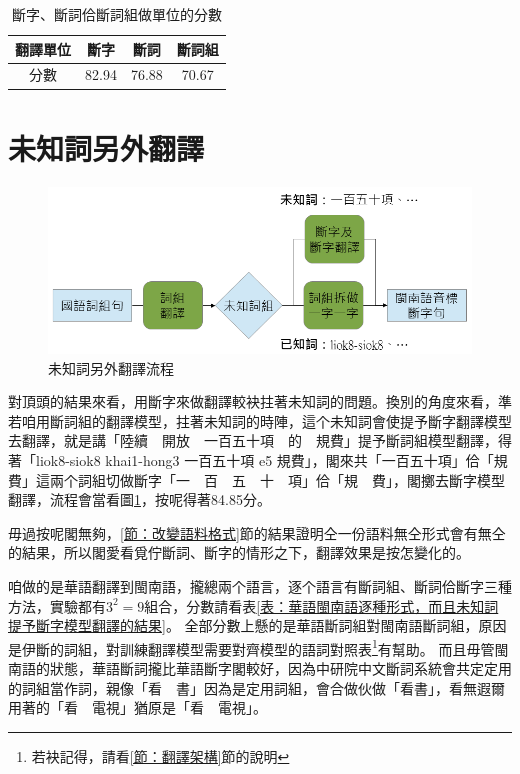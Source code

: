 \documentclass[final,oneside,onecolumn,12pt,a4paper]{book}%
\begin{document}
\begin{table}
\caption{斷字、斷詞佮斷詞組做單位的分數}%
\label{表：斷詞組、斷詞、斷字做單位的翻譯分數}
\centering
\begin{tabular}{c|ccc}
翻譯單位 & 斷字 & 斷詞 & 斷詞組\\
\hline
分數　& 82.94 & 76.88 & 70.67\\
\end{tabular}
\end{table}

\section{未知詞另外翻譯}
\label{節：未知詞另外翻譯}

\begin{figure}
\centerline{\includegraphics[keepaspectratio,width=40em]{圖/未知詞另外翻譯}}
\caption{未知詞另外翻譯流程}
\label{未知詞另外翻譯}
\end{figure}

對頂頭的結果來看，用斷字來做翻譯較袂拄著未知詞的問題。換別的角度來看，準若咱用斷詞組的翻譯模型，拄著未知詞的時陣，這个未知詞會使提予斷字翻譯模型去翻譯，就是講「陸續　開放　一百五十項　的　規費」提予斷詞組模型翻譯，得著「liok8-siok8 khai1-hong3 一百五十項 e5 規費」，閣來共「一百五十項」佮「規費」這兩个詞組切做斷字「一　百　五　十　項」佮「規　費」，閣擲去斷字模型翻譯，流程會當看圖\ref{未知詞另外翻譯}，按呢得著84.85分。

毋過按呢閣無夠，\ref{節：改變語料格式}節的結果證明仝一份語料無仝形式會有無仝的結果，所以閣愛看覓佇斷詞、斷字的情形之下，翻譯效果是按怎變化的。

咱做的是華語翻譯到閩南語，攏總兩个語言，逐个語言有斷詞組、斷詞佮斷字三種方法，實驗都有$3^{2}=9$組合，分數請看表\ref{表：華語閩南語逐種形式，而且未知詞提予斷字模型翻譯的結果}。
全部分數上懸的是華語斷詞組對閩南語斷詞組，原因是伊斷的詞組，對訓練翻譯模型需要對齊模型的語詞對照表\footnote{若袂記得，請看\ref{節：翻譯架構}節的說明}有幫助。
而且毋管閩南語的狀態，華語斷詞攏比華語斷字閣較好，因為中研院中文斷詞系統會共定定用的詞組當作詞，親像「看　書」因為是定用詞組，會合做伙做「看書」，看無遐爾用著的「看　電視」猶原是「看　電視」。
\end{document}
